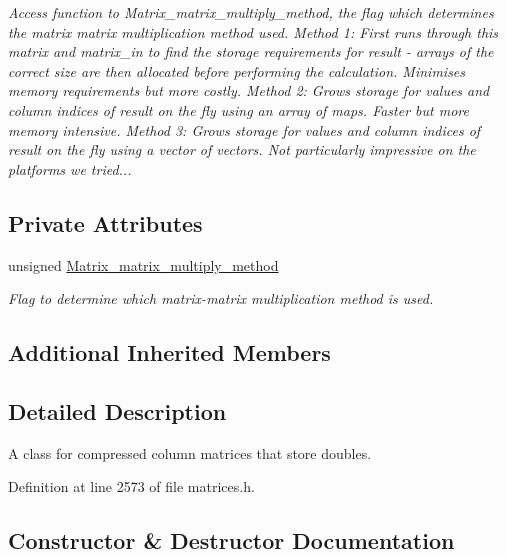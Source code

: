 \begin{DoxyCompactItemize}
\begin{DoxyCompactList}\small\item\em Access function to Matrix\+\_\+matrix\+\_\+multiply\+\_\+method, the flag which determines the matrix matrix multiplication method used. Method 1\+: First runs through this matrix and matrix\+\_\+in to find the storage requirements for result -\/ arrays of the correct size are then allocated before performing the calculation. Minimises memory requirements but more costly. Method 2\+: Grows storage for values and column indices of result \textquotesingle{}on the fly\textquotesingle{} using an array of maps. Faster but more memory intensive. Method 3\+: Grows storage for values and column indices of result \textquotesingle{}on the fly\textquotesingle{} using a vector of vectors. Not particularly impressive on the platforms we tried... \end{DoxyCompactList}\end{DoxyCompactItemize}
\subsection*{Private Attributes}
\begin{DoxyCompactItemize}
\item 
unsigned \hyperlink{classoomph_1_1CCDoubleMatrix_afb1660974c8f6218c2a000c2d6c6d267}{Matrix\+\_\+matrix\+\_\+multiply\+\_\+method}
\begin{DoxyCompactList}\small\item\em Flag to determine which matrix-\/matrix multiplication method is used. \end{DoxyCompactList}\end{DoxyCompactItemize}
\subsection*{Additional Inherited Members}


\subsection{Detailed Description}
A class for compressed column matrices that store doubles. 

Definition at line 2573 of file matrices.\+h.



\subsection{Constructor \& Destructor Documentation}
\mbox{\label{classoomph_1_1CCDoubleMatrix_abc80ef8ffa3a961daf6759bb2c574239}} 
